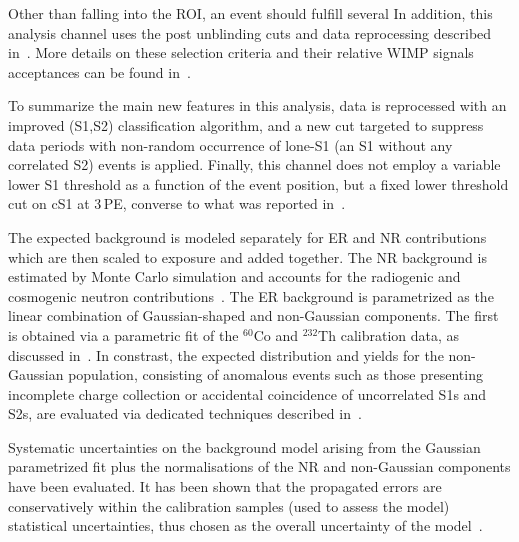 Other than falling into the ROI, an event should fulfill several  In addition, this analysis channel uses the post unblinding cuts and data reprocessing described in~\cite{xe100_run_combination}. More details on these selection criteria and their relative WIMP signals acceptances can be found in~\cite{Aprile:2012vw,xe100_run_combination}. 


To summarize the main new features in this analysis, data is reprocessed with an improved (S1,S2) classification algorithm, and a new cut targeted to suppress data periods with non-random occurrence of lone-S1 (an S1 without 
any correlated S2) events is applied. 
Finally, this channel does not employ a variable lower S1 threshold as a function of the event position, but a fixed 
lower threshold cut on cS1 at 3\,PE, converse to what was reported in~\cite{xe100_run_combination}.

The expected background is modeled separately for ER and NR contributions which are then scaled to exposure and added together.
The NR background is estimated by Monte Carlo simulation and accounts for the radiogenic and cosmogenic neutron
contributions~\cite{Aprile:2013tov}.
The ER background is parametrized as the linear combination of Gaussian-shaped and non-Gaussian components.
The first is obtained via a parametric fit of the $^{60}$Co and $^{232}$Th calibration data, as discussed in~\cite{xe100_run10_si}.
In constrast, the expected distribution and yields for the non-Gaussian population, consisting of anomalous events such as those 
presenting incomplete charge collection or accidental coincidence of uncorrelated S1s and S2s,  
are evaluated via dedicated techniques described in~\cite{xe100_run_combination}.

Systematic uncertainties on the background model arising from the Gaussian parametrized fit plus the normalisations of the NR and non-Gaussian components have been evaluated. It has been shown that the propagated errors are conservatively within the calibration samples (used to assess the model) statistical uncertainties, 
thus  chosen as the overall uncertainty of the model~\cite{xe100_run_combination}. 
